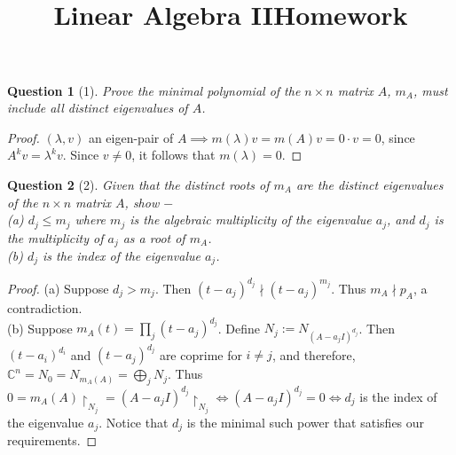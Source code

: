\documentclass[11pt]{article}
\title{\vspace{-50pt}
\Huge \name
\\\vspace{20pt}
\huge Linear Algebra II\hfill Homework \hw}
\author{}
\date{}
\theoremstyle{quest}
\newtheorem*{question}{Question}
\begin{document}
\maketitle

\begin{question}[1]
Prove the minimal polynomial of the $n \times n$ matrix $A$, $m_A$, must include all distinct eigenvalues of $A$.
\end{question}
\begin{proof}
$(\lambda, v)$ an eigen-pair of $A \implies m(\lambda)v = m(A)v = 0 \cdot v = 0$, since $A^k v = \lambda^k v$. Since $v \ne 0$, it follows that $m(\lambda) = 0$.
\end{proof}
\begin{question}[2]
Given that the distinct roots of $m_A$ are the distinct eigenvalues of the $n \times n$ matrix $A$, show $-$
\\(a) $d_j \le m_j$ where $m_j$ is the algebraic multiplicity of the eigenvalue $a_j$, and $d_j$ is the multiplicity of $a_j$ as a root of  $m_A$.
\\(b) $d_j$ is the index of the eigenvalue $a_j$.
\end{question}
\begin{proof}
(a) Suppose $d_j > m_j$. Then $(t - a_j)^{d_j} \nmid (t - a_j)^{m_j}$. Thus $m_A \nmid p_A$, a contradiction.
\\(b) Suppose $m_A(t) = \prod_j(t-a_j)^{d_j}$. Define $N_j := N_{(A-a_jI)^{d_j}}$. Then $(t-a_i)^{d_i}$ and $(t-a_j)^{d_j}$ are coprime for $i \ne j$, and therefore, $\mathbb{C}^n = N_0 = N_{m_A(A)} = \bigoplus_j N_j$. Thus $0 = m_A(A) \restriction_{N_j} = (A - a_jI)^{d_j} \restriction_{N_j} \iff (A - a_jI)^{d_j} = 0 \iff d_j$ is the index of the eigenvalue $a_j$. Notice that $d_j$ is the minimal such power that satisfies our requirements.
\end{proof}
\end{document}
